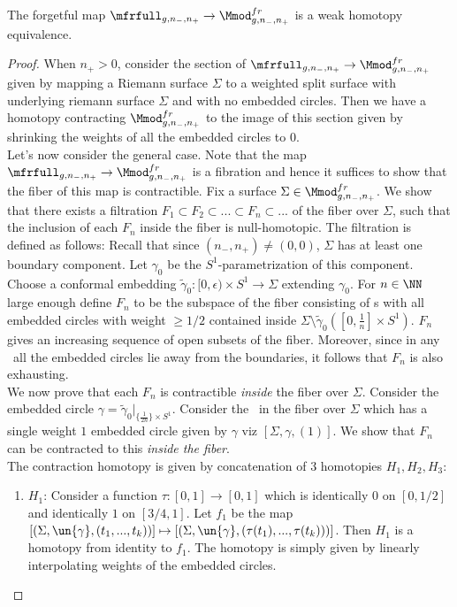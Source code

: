 \documentclass[a4paper,10pt]{amsart}
\begin{document}
\begin{proposition}\label{polkaproposition}
	The forgetful map $\mfrfull_{g,n_-,n_+} \to \Mmod^{fr}_{g,n_-,n_+}$ is a weak homotopy equivalence.
\end{proposition}
\begin{proof}
	When $n_+>0$, consider the section of $\mfrfull_{g,n_-,n_+} \to \Mmod^{fr}_{g,n_-,n_+}$ given by mapping a Riemann surface $\Sigma$ to a weighted split surface with underlying riemann surface $\Sigma$ and with no embedded circles. Then we have a homotopy contracting $\Mmod^{fr}_{g,n_-,n_+}$ to the image of this section given by shrinking the weights of all the embedded circles to $0$.\\
	Let's now consider the general case. Note that the map $\mfrfull_{g,n_-,n_+} \to \Mmod^{fr}_{g,n_-,n_+}$ is a fibration and hence it suffices to show that the fiber of this map is contractible. Fix a surface $\Sigma \in \Mmod^{fr}_{g,n_-,n_+}$. We show that there exists a filtration $F_1 \subset F_2 \subset ... \subset F_n \subset ... $ of the fiber over $\Sigma$, such that the inclusion of each $F_n$ inside the fiber is null-homotopic. 
	The filtration is defined as follows: Recall that since $(n_-,n_+) \neq (0,0)$, $\Sigma$ has at least one boundary component. Let $\gamma_0$ be the $S^1$-parametrization of this component. Choose a conformal embedding $\widetilde{\gamma}_0 \colon [0,\epsilon) \times S^1 \to \Sigma$ extending $\gamma_0$. For $n \in \NN$ large enough define $F_n$ to be the subspace of the fiber consisting of {\splitsurface}s with all embedded circles with weight $\geq 1/2$ contained inside $\Sigma \setminus \widetilde{\gamma}_0([0,\frac{1}{n}] \times S^1)$. $F_n$ gives an increasing sequence of open subsets of the fiber. Moreover, since in any \splitsurface\  all the embedded circles lie away from the boundaries, it follows that $F_n$ is also exhausting.\\
	We now prove that each $F_n$ is contractible \emph{inside} the fiber over $\Sigma$. Consider the embedded circle $\gamma = \widetilde{\gamma}_0|_{\{\frac{1}{2n}\} \times S^1}$. Consider the \splitsurface\  in the fiber over $\Sigma$ which has a single weight $1$ embedded circle given by $\gamma$ viz $[\Sigma,\gamma,(1)]$. We show that $F_n$ can be contracted to this {\splitsurface}  \emph{inside the fiber}.\\
	The contraction homotopy is given by concatenation of $3$ homotopies $H_1,H_2,H_3$:
	\begin{enumerate}
		\item $H_1$: Consider a function $\tau \colon [0,1] \to [0,1]$ which is identically $0$ on $[0,1/2]$ and identically $1$ on $[3/4,1]$. Let $f_{1}$ be the map $[(\Sigma,\un{\gamma}, (t_1,...,t_k))] \mapsto [ (\Sigma,\un{\gamma}, ( \tau(t_1),...,\tau(t_k))) ]$. Then $H_1$ is a homotopy from identity to $f_{1}$. The homotopy is simply given by linearly interpolating weights of the embedded circles.

\end{enumerate}
\end{proof}
\end{document}
